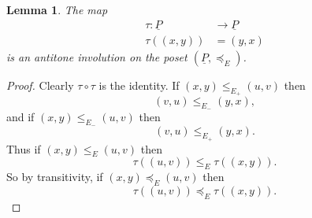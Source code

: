 \documentclass[11pt,a4paper,abstract=yes]{scrartcl}
\theoremstyle{plain}
\newtheorem{lemma}[theorem]{Lemma}
\newcommand{\arel}{\le_{E_+}}
\newcommand{\brel}{\le_{E_-}}
\newcommand{\erel}{\le_{E}}
\newcommand{\transerel}{\preceq_{E}}
\newcommand{\Pairs}[1]{\underline{#1}}
\newcommand{\Ppairs}{\Pairs{P}}
\begin{document}
\begin{lemma}
The map
\begin{equation}
\label{isotone}
  \begin{split}
    \tau: \Ppairs & \to \Ppairs \\
    \tau((x,y)) & = (y,x)
  \end{split}
\end{equation}
is an antitone involution on the poset \((\Ppairs, \transerel)\).
\end{lemma}
\begin{proof}
Clearly \(\tau \circ \tau\) is the identity.
If \((x,y) \arel (u,v)\) then \[(v,u) \brel (y,x),\]
and if \((x,y) \brel (u,v)\) then \[(v,u) \arel (y,x).\]
Thus if \((x,y) \erel (u,v)\) then
\[\tau((u,v)) \erel \tau((x,y)).\] So by transitivity, if
\((x,y) \transerel (u,v)\) then
\[\tau((u,v)) \transerel \tau((x,y)).\]
\end{proof}
\end{document}
